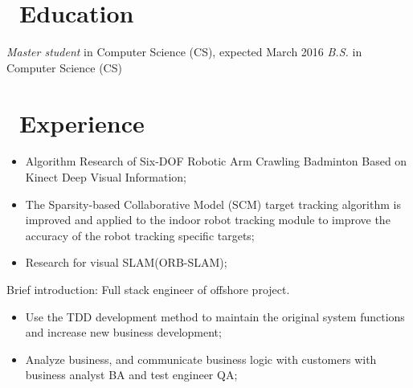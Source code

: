 \documentclass{resume}
\begin{document}



\section{\faGraduationCap\ Education}
\textit{Master student} in Computer Science (CS), expected March 2016
\textit{B.S.} in Computer Science (CS)

\section{\faUsers\ Experience}

\begin{itemize}
  \item Algorithm Research of Six-DOF Robotic Arm Crawling Badminton Based on Kinect Deep Visual Information;
  \item The Sparsity-based Collaborative Model (SCM) target tracking algorithm is improved and applied to the indoor robot tracking module to improve the accuracy of the robot tracking specific targets;
  \item Research for visual SLAM(ORB-SLAM);
\end{itemize}

Brief introduction: Full stack engineer of offshore project.
\begin{itemize}
  \item Use the TDD development method to maintain the original system functions and increase new business development;
  \item Analyze business, and communicate business logic with customers with business analyst BA and test engineer QA;
\end{itemize}
\end{document}
